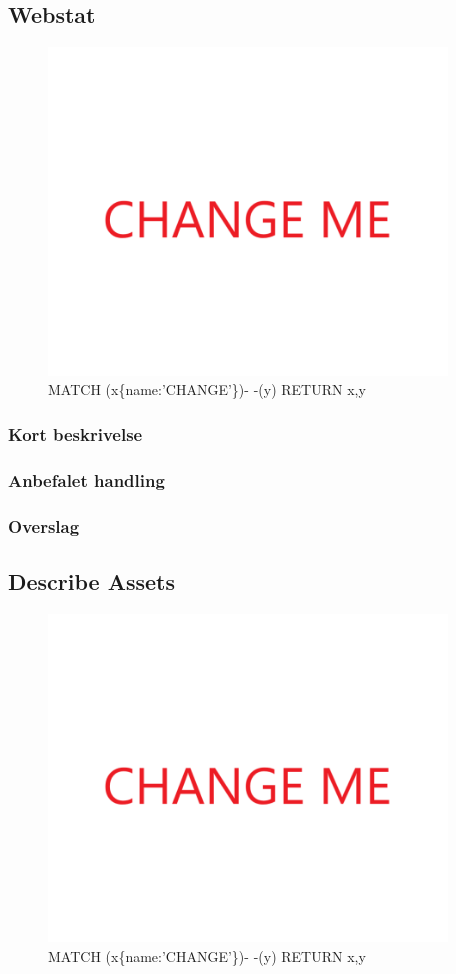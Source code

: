 \documentclass{article}
\begin{document}
\subsection{Webstat}
\begin{figure}[h]
\includegraphics[width=300pt]{CHANGE.PNG}
\caption{MATCH (x\{name:'CHANGE'\})- -(y) RETURN x,y}
\end{figure}
\subsubsection{Kort beskrivelse}
\subsubsection{Anbefalet handling}
\subsubsection{Overslag}


\subsection{Describe Assets}
\begin{figure}[h]
\includegraphics[width=300pt]{CHANGE.PNG}
\caption{MATCH (x\{name:'CHANGE'\})- -(y) RETURN x,y}
\end{figure}
\end{document}
